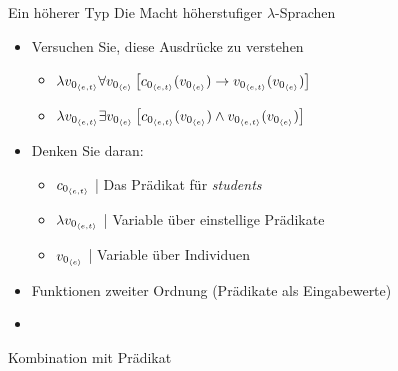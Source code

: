 \begin{frame}
  {Ein höherer Typ}
  \onslide<+->
  \onslide<+->
  Die Macht höherstufiger $\lambda$-Sprachen\\
  \Zeile 
  \begin{itemize}[<+->]
    \item Versuchen Sie, diese Ausdrücke zu verstehen
      \begin{itemize}[<+->]
        \item \alert{$\lambda{}v_{0_{{\langle{}e,t\rangle}}}\forall{v_{0_{{\langle{}e\rangle}}}}\left[{}c_{0_{{\langle{}e,t\rangle}}}(v_{0_{{\langle{}e\rangle}}})\rightarrow{}v_{0_{{\langle{}e,t\rangle}}}(v_{0_{{\langle{}e\rangle}}})\right]$}
        \item \alert{$\lambda{}v_{0_{{\langle{}e,t\rangle}}}\exists{v_{0_{{\langle{}e\rangle}}}}\left[{}c_{0_{{\langle{}e,t\rangle}}}(v_{0_{{\langle{}e\rangle}}})\wedge{}v_{0_{{\langle{}e,t\rangle}}}(v_{0_{{\langle{}e\rangle}}})\right]$}
      \end{itemize}
    \item Denken Sie daran:
      \begin{itemize}[<+->]
        \item $c_{0_{{\langle{}e,t\rangle}}}$ | Das Prädikat für \textit{students}
        \item $\lambda{}v_{0_{{\langle{}e,t\rangle}}}$ | Variable über einstellige Prädikate
        \item $v_{0_{{\langle{}e\rangle}}}$ | Variable über Individuen
      \end{itemize}
      \Halbzeile
    \item \alert{Funktionen zweiter Ordnung} (Prädikate als Eingabewerte) 
      \Halbzeile
      \onslide<+->
    \item {}
  \end{itemize}
\end{frame}

\begin{frame}
  {Kombination mit Prädikat}
  \onslide<+->
  \onslide<+->
  \centering 
\end{frame}

